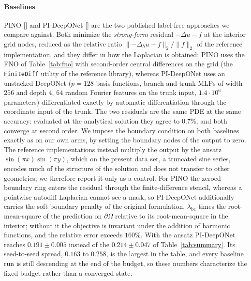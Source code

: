 \documentclass{article} %
\begin{document}
\paragraph{Baselines} PINO [] and PI-DeepONet [] are the two published label-free approaches we compare against. Both minimize the \emph{strong-form} residual $-\Delta u - f$ at the interior grid nodes, reduced as the relative ratio $\|{-\Delta_h u} - f\|_2 / \|f\|_2$ of the reference implementation, and they differ in how the Laplacian is obtained: PINO uses the FNO of Table~\ref{tab:fno} with second-order central differences on the grid (the \texttt{FiniteDiff} utility of the reference library), whereas PI-DeepONet uses an unstacked DeepONet ($p=128$ basis functions, branch and trunk MLPs of width $256$ and depth $4$, $64$ random Fourier features on the trunk input, $1.4\cdot 10^6$ parameters) differentiated exactly by automatic differentiation through the coordinate input of the trunk. The two residuals are the same PDE at the same accuracy: evaluated at the analytical solution they agree to $0.7\%$, and both converge at second order. We impose the boundary condition on both baselines exactly as on our own arms, by setting the boundary nodes of the output to zero. The reference implementations instead multiply the output by the ansatz $\sin(\pi x)\sin(\pi y)$, which on the present data set, a truncated sine series, encodes much of the structure of the solution and does not transfer to other geometries; we therefore report it only as a control. For PINO the zeroed boundary ring enters the residual through the finite-difference stencil, whereas a pointwise autodiff Laplacian cannot see a mask, so PI-DeepONet additionally carries the soft boundary penalty of the original formulation, $\lambda_{\mathrm{bc}}$ times the root-mean-square of the prediction on $\partial\Omega$ relative to its root-mean-square in the interior; without it the objective is invariant under the addition of harmonic functions, and the relative error exceeds $160\%$. With the ansatz PI-DeepONet reaches $0.191 \pm 0.005$ instead of the $0.214 \pm 0.047$ of Table~\ref{tab:summary}. Its seed-to-seed spread, $0.163$ to $0.258$, is the largest in the table, and every baseline run is still descending at the end of the budget, so these numbers characterize the fixed budget rather than a converged state.
\end{document}
